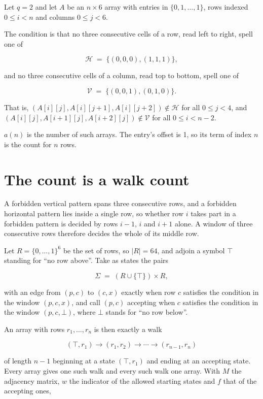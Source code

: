 \documentclass[11pt]{article}
\theoremstyle{definition}
\begin{document}
Let $q = 2$ and let $A$ be an $n \times 6$ array with entries in $\{0,1,\dots,1\}$, rows indexed $0 \le i < n$ and columns $0 \le j < 6$.

The condition is that no three consecutive cells of a row, read left to right, spell one of

\[\mathcal{H} \;=\; \{(0,0,0), (1,1,1)\},\]

and no three consecutive cells of a column, read top to bottom, spell one of

\[\mathcal{V} \;=\; \{(0,0,1), (0,1,0)\}.\]

That is, $(A[i][j],A[i][j{+}1],A[i][j{+}2]) \notin \mathcal{H}$ for all $0 \le j < 4$, and $(A[i][j],A[i{+}1][j],A[i{+}2][j]) \notin \mathcal{V}$ for all $0 \le i < n-2$.

$a(n)$ is the number of such arrays. The entry's offset is 1, so its term of index $n$ is the count for $n$ rows.

\section{The count is a walk count}

A forbidden vertical pattern spans three consecutive rows, and a forbidden horizontal pattern lies inside a single row, so whether row $i$ takes part in a forbidden pattern is decided by rows $i-1$, $i$ and $i+1$ alone. A window of three consecutive rows therefore decides the whole of its middle row.

Let $R = \{0,\dots,1\}^{6}$ be the set of rows, so $|R| = 64$, and adjoin a symbol $\top$ standing for ``no row above''. Take as states the pairs

\[\Sigma \;=\; (R \cup \{\top\}) \times R,\]

with an edge from $(p,c)$ to $(c,x)$ exactly when row $c$ satisfies the condition in the window $(p,c,x)$, and call $(p,c)$ accepting when $c$ satisfies the condition in the window $(p,c,\bot)$, where $\bot$ stands for ``no row below''.

An array with rows $r_1,\dots,r_n$ is then exactly a walk

\[(\top,r_1) \to (r_1,r_2) \to \cdots \to (r_{n-1},r_n)\]

of length $n-1$ beginning at a state $(\top,r_1)$ and ending at an accepting state. Every array gives one such walk and every such walk one array. With $M$ the adjacency matrix, $w$ the indicator of the allowed starting states and $f$ that of the accepting ones,
\end{document}
